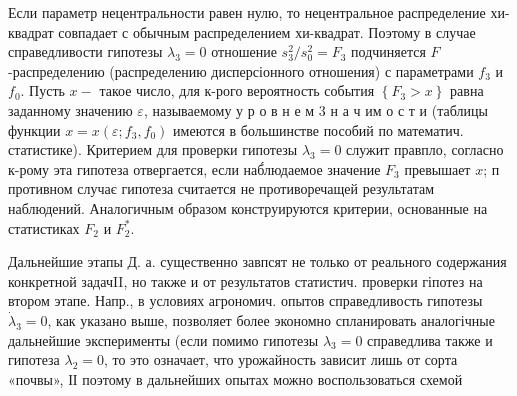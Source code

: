 \documentclass[10pt]{article}
\begin{document}
Если параметр нецентральности равен нулю, то нецентральное распределение хи-квадрат совпадает с обычным распределением хи-квадрат. Поэтому в случае справедливости гипотезы $\lambda_{3}=0$ отношение $s_{3}^{2} / s_{0}^{2}=F_{3}$ подчиняется $F$-распределению (распределению дисперсіонного отношения) с параметрами $f_{3}$ и $f_{0}$. Пусть $x-$ такое число, для к-рого вероятность события $\left\{F_{3}>x\right\}$ равна заданному значению $\varepsilon$, называемому у р о в н е м 3 н а ч им о с т и (таблицы функции $x=x\left(\varepsilon ; f_{3}, f_{0}\right)$ имеются в большинстве пособий по математич. статистике). Критерием для проверки гипотезы $\lambda_{3}=0$ служит правпло, согласно к-рому эта гипотеза отвергается, если наб́людаемое значение $F_{3}$ превышает $x$; п противном случає гипотеза считается не противоречащей результатам наблюдений. Аналогичным образом конструируются критерии, основанные на статистиках $F_{2}$ и $F_{2}^{*}$.



Дальнейшие этапы Д. а. существенно завпсят не только от реального содержания конкретной задачII, но также и от результатов статистич. проверки гіпотез на втором этапе. Напр., в условиях агрономич. опытов справедливость гипотезы $\dot{\lambda}_{3}=0$, как указано выше, позволяет более экономно спланировать аналогічные дальнейшие эксперименты (если помимо гипотезы $\lambda_{3}=0$ справедлива также и гипотеза $\lambda_{2}=0$, то это означает, что урожайность зависит лишь от сорта «почвы», ІІ поэтому в дальнейших опытах можно воспользоваться схемой
\end{document}
